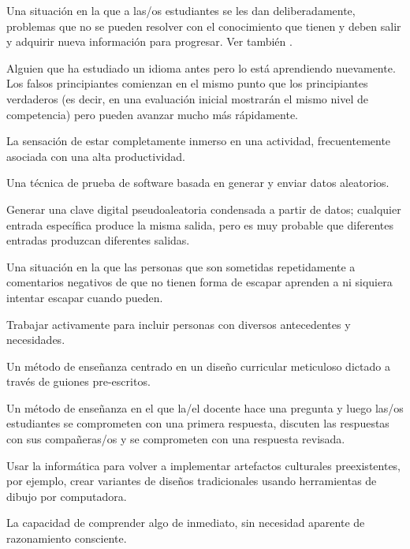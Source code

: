 \begin{description}
 Una situación en la que a las/os estudiantes se les dan deliberadamente, problemas que no se pueden resolver con el conocimiento que tienen y deben salir y adquirir nueva información para progresar. 
Ver también .

 Alguien que ha estudiado un idioma antes pero lo está aprendiendo nuevamente. Los falsos principiantes comienzan en el mismo punto que los principiantes verdaderos (es decir, en una evaluación inicial mostrarán el mismo nivel de competencia) pero pueden avanzar mucho más rápidamente.

 La sensación de estar completamente inmerso en una actividad, 
frecuentemente asociada con una alta productividad.

 Una técnica de prueba de software 
basada en generar y enviar datos aleatorios.

 Generar una clave digital pseudoaleatoria condensada a partir de datos; cualquier entrada específica produce la misma salida, pero es muy probable que diferentes entradas produzcan diferentes salidas.

 Una situación en la que las personas que son sometidas repetidamente a comentarios negativos de que no tienen forma de escapar aprenden a ni siquiera intentar escapar cuando pueden.

 Trabajar activamente para incluir 
personas con diversos antecedentes y necesidades.

 Un método de enseñanza centrado 
en un diseño curricular meticuloso dictado a través de guiones pre-escritos.

 Un método de enseñanza en el que la/el docente hace una pregunta y luego las/os estudiantes se comprometen con una primera respuesta, discuten las respuestas con sus compañeras/os y se comprometen con una respuesta revisada.

 Usar la informática 
para volver a implementar artefactos culturales preexistentes, por ejemplo, 
crear variantes de diseños tradicionales usando herramientas de dibujo por computadora.

 La capacidad de comprender algo de inmediato, 
sin necesidad aparente de razonamiento consciente.


\end{description}
